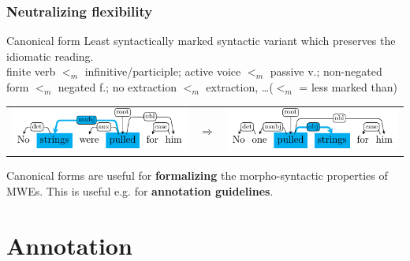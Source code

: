 \documentclass[xcolor=dvipsnames]{beamer}
\begin{document}
\begin{frame} 
\frametitle{Neutralizing flexibility}

\begin{block}{Canonical form}
Least syntactically marked syntactic variant which preserves the idiomatic reading.\\
{\tiny finite verb $<_m$ infinitive/participle; active voice $<_m$ passive v.; non-negated form $<_m$ negated f.; no extraction $<_m$ extraction, \ldots ($<_m$ = less marked than)}

\setlength{\tabcolsep}{0.3mm}
\begin{tabular}{ccc}
\includegraphics[scale=0.8]{Images/pull-strings-idio-pass-sent-short.pdf} & 
$\Longrightarrow$ &
\includegraphics[scale=0.8]{Images/pull-strings-idio-act-sent-short.pdf}  %
\end{tabular}
\end{block}

\begin{block}{}
Canonical forms are useful for \textbf{formalizing} the morpho-syntactic properties of MWEs. This is useful e.g. for \textbf{annotation guidelines}.
\end{block}

\end{frame}

\section{Annotation} 
\subsection{}
\end{document}
